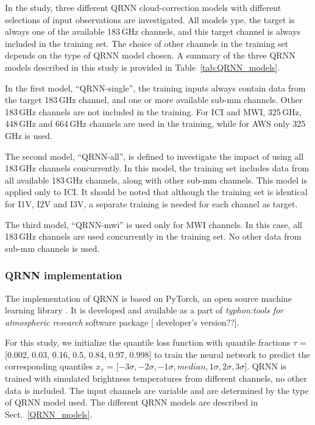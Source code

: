 \documentclass[amt, manuscript]{copernicus}
\newcommand{\todo}[1]{{\color{red} #1}}
\begin{document}
In the study, three different QRNN cloud-correction models with different selections of input observations are
investigated. All models ype, the target is always one of the available 183\,GHz channels, and this target channel is always included in the training set. The choice of other channels in the training set depends on the type of QRNN model chosen. A summary of the three QRNN models described in this study is provided in Table~\ref{tab:QRNN_models}.


In the first model, ``QRNN-single'', the training inputs always contain data from the target 183\,GHz channel, and one or more available sub-mm channels. Other 183\,GHz channels are not included in the training. For ICI and MWI, 325\,GHz, 448\,GHz and 664\,GHz channels are used in the training, while for AWS only 325\,GHz is used.
 
The second model, ``QRNN-all'', is defined to investigate the  impact of using all 183\,GHz channels concurrently. In this model, the training set includes data from all available 183\,GHz channels, along with other sub-mm channels. This model is applied only to ICI. It should be noted that although the training set is identical for I1V, I2V and I3V, a separate training is needed for each channel as target.

The third model, ``QRNN-mwi'' is used only for MWI channels. In this case, all 183\,GHz channels are used concurrently in the training set. No other data from sub-mm channels is used. 


\subsubsection{QRNN implementation}
\label{sec:qrnn-implementation}

The implementation of QRNN is based on PyTorch, an open source machine learning library \citep{paszke2017automatic}. It is developed and available as a part of \textit{typhon:tools for atmospheric research} software package [\todo{developer's version??}].

For this study, we initialize the quantile loss function with quantile fractions $\tau$ = [0.002, 0.03, 0.16, 0.5, 0.84, 0.97, 0.998] to train the neural network to predict the corresponding quantiles $x_{\tau}$ = [$-3\sigma, -2\sigma, -1\sigma, median, 1\sigma, 2\sigma, 3\sigma $]. QRNN is trained with simulated brightness temperatures from different channels, no other data is included. The input channels are variable and are determined by the type of QRNN model used. The different QRNN models are described in Sect.~\ref{QRNN_models}. 
\end{document}
